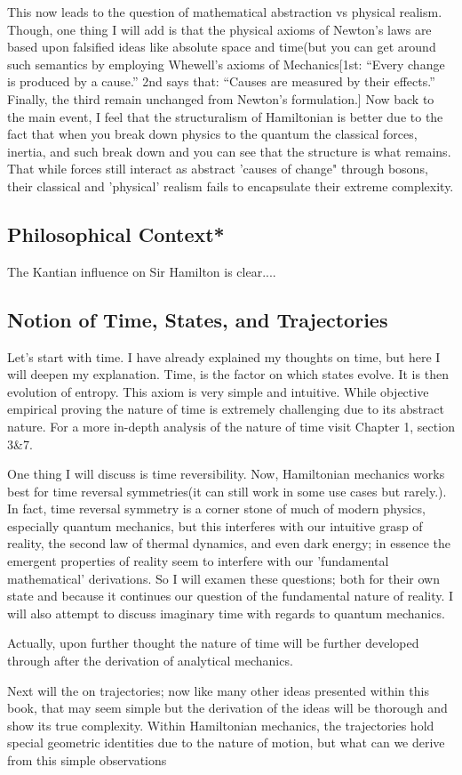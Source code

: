 \par This now leads to the question of mathematical abstraction vs physical realism. Though, one thing I will add is that the physical axioms of Newton's laws are based upon falsified ideas like absolute space and time(but you can get around such semantics by employing Whewell's axioms of Mechanics[1st: “Every change is produced by a cause.”
2nd says that: “Causes are measured by their effects.” Finally, the third remain unchanged from Newton's formulation.] Now back to the main event, I feel that the structuralism of Hamiltonian is better due to the fact that when you break down physics to the quantum the classical forces, inertia, and such break down and you can see that the structure is what remains. That while forces still interact as abstract 'causes of change" through bosons, their classical and 'physical' realism fails to encapsulate their extreme complexity.

\subsection{Philosophical Context*}
\par The Kantian influence on Sir Hamilton is clear....
\subsection{Notion of Time, States, and Trajectories}
\par Let's start with time. I have already explained my thoughts on time, but here I will deepen my explanation. Time, is the factor on which states evolve. It is then evolution of entropy. This axiom is very simple and intuitive. While objective empirical proving the nature of time is extremely challenging due to its abstract nature. For a more in-depth analysis of the nature of time visit Chapter 1, section 3\&7.
\par One thing I will discuss is time reversibility. Now, Hamiltonian mechanics works best for time reversal symmetries(it can still work in some use cases but rarely.). In fact, time reversal symmetry is a corner stone of much of modern physics, especially quantum mechanics, but this interferes with our intuitive grasp of reality, the second law of thermal dynamics, and even dark energy; in essence the emergent properties of reality seem to interfere with our 'fundamental mathematical' derivations. So I will examen these questions; both for their own state and because it continues our question of the fundamental nature of reality. I will also attempt to discuss imaginary time with regards to quantum mechanics.
\par Actually, upon further thought the nature of time will be further developed through after the derivation of analytical mechanics.
\par Next will the on trajectories; now like many other ideas presented within this book, that may seem simple but the derivation of the ideas will be thorough and show its true complexity. Within Hamiltonian mechanics, the trajectories hold special geometric identities due to the nature of motion, but what can we derive from this simple observations

